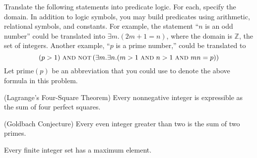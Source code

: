 \documentclass[twoside,12pt]{article}
\providecommand{\abs}[1]{\lvert#1\rvert}
\begin{document}


\begin{problem}{24}
Translate the following statements into predicate logic.  For each,
specify the domain.  In addition to logic symbols, you
may build predicates using arithmetic, relational symbols, and
constants.  For example, the statement ``$n$ is an odd number'' could
be translated into $\exists m. (2m+1 = n)$, where the domain is $\mathbb{Z}$, 
the set of integers.  Another example, ``$p$ is a prime number,'' could be 
translated to 
\[
(p > 1) \footnotesize{\textsc{  AND } \textsc{NOT}} \left(\exists m. \exists n. (m > 1 \footnotesize{\textsc{   AND   }} n > 1 \footnotesize{\textsc{   AND   }} mn = p)\right)
\]
Let $\text{prime}(p)$ be an abbreviation that you could use to denote the above formula 
in this problem.

\bparts

 (Lagrange's Four-Square Theorem) Every nonnegative integer is
expressible as the sum of four perfect squares.


 (Goldbach Conjecture) Every even integer greater than two is
the sum of two primes.


 Every finite integer set has a maximum element.




\end{problem}
\end{document}
